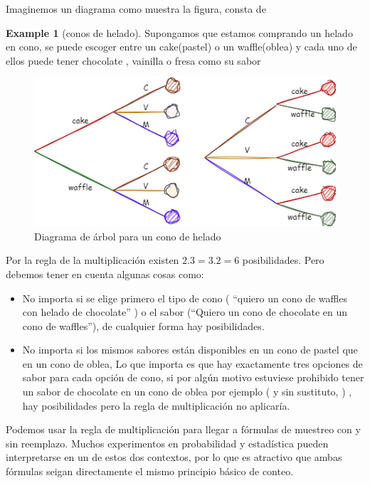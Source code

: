 \documentclass[
]{book}
\theoremstyle{definition}
\theoremstyle{definition}
\newtheorem{example}{Example}[chapter]
\theoremstyle{definition}
\theoremstyle{definition}
\theoremstyle{remark}
\begin{document}
Imaginemos un diagrama como muestra la figura, consta de

\begin{example}[conos de helado]
\protect\hypertarget{exm:ejemplomultiplicacion}{}\label{exm:ejemplomultiplicacion}Supongamos que estamos comprando un helado en cono, se puede escoger entre un cake(pastel) o un waffle(oblea) y cada uno de ellos puede tener chocolate , vainilla o fresa como su sabor
\end{example}

\begin{figure}

{\centering \includegraphics[width=0.8\linewidth]{./images/reglademultiplicacion1.drawio} 

}

\caption{Diagrama de árbol para un cono de helado}\label{fig:unnamed-chunk-4}
\end{figure}

Por la regla de la multiplicación existen \(2.3=3.2=6\) posibilidades. Pero debemos tener en cuenta algunas cosas como:

\begin{itemize}
\item
  No importa si se elige primero el tipo de cono ( ``quiero un cono de waffles con helado de chocolate'' ) o el sabor (``Quiero un cono de chocolate en un cono de waffles''), de cualquier forma hay posibilidades.
\item
  No importa si los mismos sabores están disponibles en un cono de pastel que en un cono de oblea, Lo que importa es que hay exactamente tres opciones de sabor para cada opción de cono, si por algún motivo estuviese prohibido tener un sabor de chocolate en un cono de oblea por ejemplo ( y sin sustituto, ) , hay posibilidades pero la regla de multiplicación no aplicaría.
\end{itemize}

Podemos usar la regla de multiplicación para llegar a fórmulas de muestreo con y sin reemplazo. Muchos experimentos en probabilidad y estadística pueden interpretarse en un de estos dos contextos, por lo que es atractivo que ambas fórmulas seigan directamente el mismo principio básico de conteo.
\end{document}
